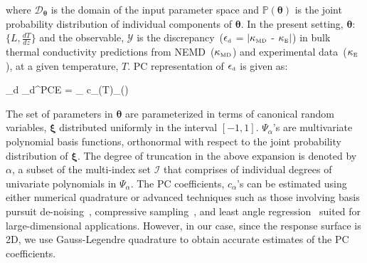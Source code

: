 \noindent where $\mathcal{D}_{\bm{\theta}}$ is the domain of the input parameter space and 
$\mathbb{P}(\bm{\theta})$ is the joint probability distribution of individual components of $\bm{\theta}$.
In the present setting, $\bm{\theta}$:~$\{L,\frac{dT}{dz}\}$ and the observable, $\mathcal{Y}$ is the
discrepancy~($\epsilon_{\mbox{\tiny{d}}}$ = 
$\lvert\kappa_{\mbox{\tiny{MD}}}$ - $\kappa_{\mbox{\tiny{E}}}\rvert$)
in bulk thermal conductivity predictions from 
NEMD~($\kappa_{\mbox{\tiny{MD}}}$) and experimental data~($\kappa_{\mbox{\tiny{E}}}$), at a 
given temperature, $T$. PC representation of $\epsilon_{\mbox{\tiny{d}}}$ is given as:

\be
\epsilon_{\mbox{\tiny{d}}} \approx \mathcal{\epsilon}_{\mbox{\tiny{d}}}^{\mbox{\tiny{PCE}}} = 
\sum_{\alpha\in{}} c_{\alpha}(T)\Psi_{\alpha}(\bm{\xi(\theta)}) 
\ee

\noindent The set of parameters in $\bm{\theta}$ are parameterized in terms of canonical random 
variables, $\bm{\xi}$ distributed uniformly in the interval $[-1,1]$. 
 $\Psi_{\alpha}$'s are multivariate polynomial basis functions, orthonormal with respect to the joint probability 
 distribution of $\bm{\xi}$. The degree of truncation in the above expansion is denoted by $\alpha$, a subset of
 the multi-index set $\mathcal{I}$ that comprises of individual degrees of univariate polynomials in $\Psi_{\alpha}$.
The PC coefficients, $c_{\alpha}$'s can be estimated using either numerical quadrature or advanced techniques
such as those involving basis pursuit de-noising~\cite{Peng:2014}, compressive
sampling~\cite{Hampton:2015}, and least angle regression~\cite{Blatman:2011} suited for large-dimensional
applications. However, in our case, since the response surface is 2D, we use Gauss-Legendre quadrature to
obtain accurate estimates of the PC coefficients. 

